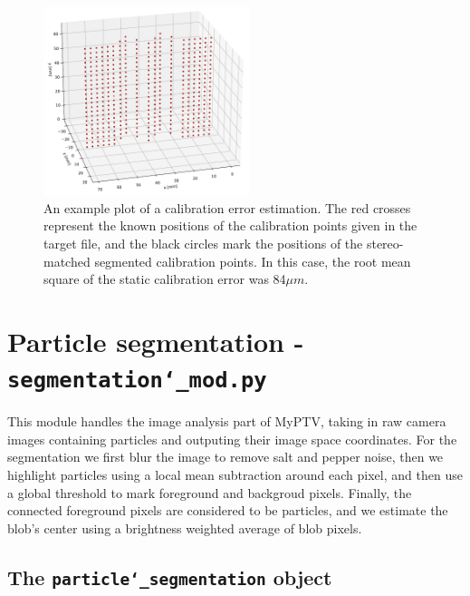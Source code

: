 \documentclass[10pt,a4paper]{article}
\begin{document}
\begin{figure}
	\centering
	\includegraphics[width=6cm]{cal_error.pdf}
	\caption{An example plot of a calibration error estimation. The red crosses represent the known positions of the calibration points given in the target file, and the black circles mark the positions of the stereo-matched segmented calibration points. In this case, the root mean square of the static calibration error was 84$\mu m$. \label{fig:cal_err}}
\end{figure}










\section{Particle segmentation - \texttt{segmentation\char`_mod.py}} 


This module handles the image analysis part of MyPTV, taking in raw camera images containing particles and outputing their image space coordinates. For the segmentation we first blur the image to remove salt and pepper noise, then we highlight particles using a local mean subtraction around each pixel, and then use a global threshold to mark foreground and backgroud pixels. Finally, the connected foreground pixels are considered to be particles, and we estimate the blob's center using a brightness weighted average of blob pixels.



\subsection{The \texttt{particle\char`_segmentation} object} 
\end{document}
